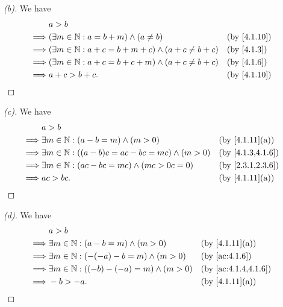 \begin{proof}[(b)]
  We have
  \begin{align*}
             & a > b                                                                            \\
    \implies & (\exists m \in \N : a = b + m) \land (a \neq b)                 &  & \by{4.1.10} \\
    \implies & (\exists m \in \N : a + c = b + m + c) \land (a + c \neq b + c) &  & \by{4.1.3}  \\
    \implies & (\exists m \in \N : a + c = b + c + m) \land (a + c \neq b + c) &  & \by{4.1.6}  \\
    \implies & a + c > b + c.                                                  &  & \by{4.1.10}
  \end{align*}
\end{proof}

\begin{proof}[(c)]
  We have
  \begin{align*}
             & a > b                                                                                        \\
    \implies & \exists m \in \N : (a - b = m) \land (m > 0)               &  & \text{(by \cref{4.1.11}(a))} \\
    \implies & \exists m \in \N : ((a - b)c = ac - bc = mc) \land (m > 0) &  & \by{4.1.3,4.1.6}             \\
    \implies & \exists m \in \N : (ac - bc = mc) \land (mc > 0c = 0)      &  & \by{2.3.1,2.3.6}             \\
    \implies & ac > bc.                                                   &  & \text{(by \cref{4.1.11}(a))}
  \end{align*}
\end{proof}

\begin{proof}[(d)]
  We have
  \begin{align*}
             & a > b                                                                                \\
    \implies & \exists m \in \N : (a - b = m) \land (m > 0)       &  & \text{(by \cref{4.1.11}(a))} \\
    \implies & \exists m \in \N : (-(-a) - b = m) \land (m > 0)   &  & \by{ac:4.1.6}                \\
    \implies & \exists m \in \N : ((-b) - (-a) = m) \land (m > 0) &  & \by{ac:4.1.4,4.1.6}          \\
    \implies & -b > -a.                                           &  & \text{(by \cref{4.1.11}(a))}
  \end{align*}
\end{proof}


